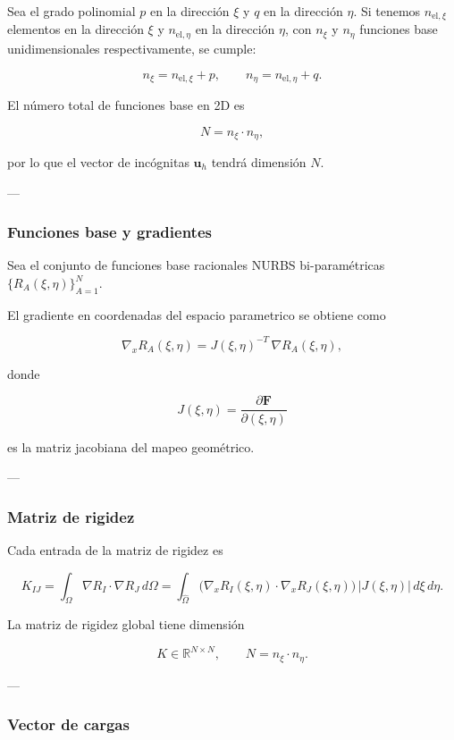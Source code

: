 \documentclass[12pt]{article}
\begin{document}
Sea el grado polinomial $p$ en la dirección $\xi$ y $q$ en la dirección $\eta$.  
Si tenemos $n_{\text{el},\xi}$ elementos en la dirección $\xi$ y 
$n_{\text{el},\eta}$ en la dirección $\eta$, con $n_\xi$ y $n_\eta$ funciones 
base unidimensionales respectivamente, se cumple:

\[
n_\xi = n_{\text{el},\xi} + p, 
\qquad
n_\eta = n_{\text{el},\eta} + q.
\]

El número total de funciones base en 2D es

\[
N = n_\xi \cdot n_\eta,
\]

por lo que el vector de incógnitas $ \mathbf u_h $ tendrá dimensión $N$.

---

\subsubsection*{Funciones base y gradientes}

Sea el conjunto de funciones base racionales NURBS bi-paramétricas 
$\{R_A(\xi,\eta)\}_{A=1}^N$.

El gradiente en coordenadas del espacio parametrico se obtiene como

\[
\nabla_x R_A(\xi,\eta) = J(\xi,\eta)^{-T} \, 
\nabla R_A(\xi,\eta),
\]

donde 

\[
J(\xi,\eta) = \frac{\partial \mathbf F}{\partial(\xi,\eta)}
\]

es la matriz jacobiana del mapeo geométrico.

---

\subsubsection*{Matriz de rigidez}

Cada entrada de la matriz de rigidez es

\[
K_{IJ} = \int_\Omega \nabla R_I \cdot \nabla R_J \, d\Omega
= \int_{\hat\Omega} 
   \big(\nabla_x R_I(\xi,\eta) \cdot \nabla_x R_J(\xi,\eta)\big) 
   \, |J(\xi,\eta)| \, d\xi\, d\eta.
\]

La matriz de rigidez global tiene dimensión

\[
K \in \mathbb{R}^{N \times N}, 
\qquad N = n_\xi \cdot n_\eta.
\]

---

\subsubsection*{Vector de cargas}
\end{document}
